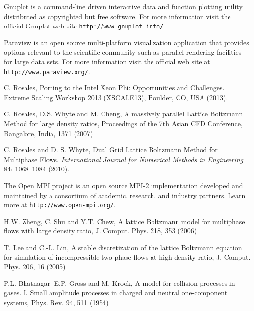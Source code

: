 \documentclass[12pt]{report}
\begin{document}
\begin{thebibliography}{00}

 Gnuplot is a command-line driven interactive data and function plotting utility distributed as copyrighted but free software. For more information visit the official Gnuplot web site \verb+http://www.gnuplot.info/+.

 Paraview is an open source multi-platform visualization application	that provides options relevant to the scientific community such as	parallel rendering facilities for large data sets. For more information visit the official web site at \verb+http://www.paraview.org/+.

 C. Rosales,  Porting to the Intel Xeon Phi: Opportunities and Challenges. Extreme Scaling Workshop 2013 (XSCALE13), Boulder, CO, USA (2013).

 C. Rosales, D.S. Whyte and M. Cheng, A massively parallel Lattice Boltzmann Method for large density ratios, Proceedings of the 7th Asian CFD Conference, Bangalore, India, 1371 (2007)

 C. Rosales and D. S. Whyte, Dual Grid Lattice Boltzmann Method for Multiphase Flows. {\it International Journal for Numerical Methods in Engineering} 84: 1068--1084 (2010).

 The Open MPI project is an open source MPI-2 implementation developed and maintained by a consortium of academic, research, and industry partners. Learn more at \verb+http://www.open-mpi.org/+.

 H.W. Zheng, C. Shu and Y.T. Chew, A lattice Boltzmann model for multiphase flows with large density ratio, J. Comput. Phys. 218, 353 (2006)

 T. Lee and C.-L. Lin, A stable discretization of the lattice Boltzmann equation for simulation of incompressible two-phase flows at high density ratio, J. Comput. Phys. 206, 16 (2005)

 P.L. Bhatnagar, E.P. Gross and M. Krook, A model for collision processes in gases. I. Small amplitude processes in charged and neutral one-component systems, Phys. Rev. 94, 511 (1954)

\end{thebibliography}
\end{document}
